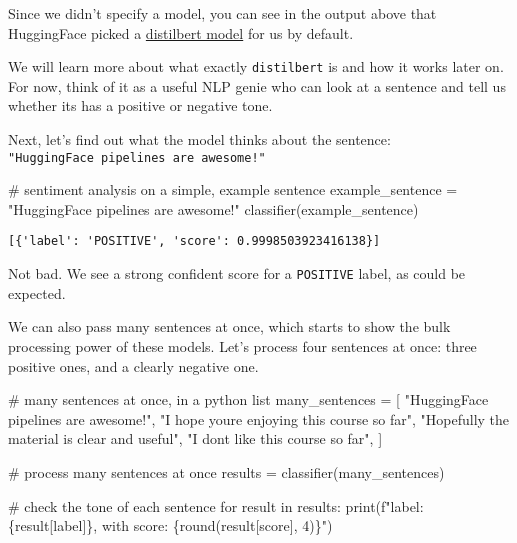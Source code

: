 \documentclass[
  letterpaper,
  DIV=11,
  numbers=noendperiod]{scrartcl}
\newenvironment{Shaded}{\begin{snugshade}}{\end{snugshade}}
\newcommand{\BuiltInTok}[1]{\textcolor[rgb]{0.00,0.23,0.31}{#1}}
\newcommand{\CommentTok}[1]{\textcolor[rgb]{0.37,0.37,0.37}{#1}}
\newcommand{\ControlFlowTok}[1]{\textcolor[rgb]{0.00,0.23,0.31}{#1}}
\newcommand{\DecValTok}[1]{\textcolor[rgb]{0.68,0.00,0.00}{#1}}
\newcommand{\KeywordTok}[1]{\textcolor[rgb]{0.00,0.23,0.31}{#1}}
\newcommand{\NormalTok}[1]{\textcolor[rgb]{0.00,0.23,0.31}{#1}}
\newcommand{\OperatorTok}[1]{\textcolor[rgb]{0.37,0.37,0.37}{#1}}
\newcommand{\SpecialCharTok}[1]{\textcolor[rgb]{0.37,0.37,0.37}{#1}}
\newcommand{\SpecialStringTok}[1]{\textcolor[rgb]{0.13,0.47,0.30}{#1}}
\newcommand{\StringTok}[1]{\textcolor[rgb]{0.13,0.47,0.30}{#1}}
\begin{document}
Since we didn't specify a model, you can see in the output above that
HuggingFace picked a
\href{distilbert-base-uncased-finetuned-sst-2-english}{distilbert model}
for us by default.

We will learn more about what exactly \texttt{distilbert} is and how it
works later on. For now, think of it as a useful NLP genie who can look
at a sentence and tell us whether its has a positive or negative tone.

Next, let's find out what the model thinks about the sentence:
\texttt{"HuggingFace\ pipelines\ are\ awesome!"}

\begin{Shaded}
\begin{Highlighting}[]
\CommentTok{\# sentiment analysis on a simple, example sentence}
\NormalTok{example\_sentence }\OperatorTok{=} \StringTok{"HuggingFace pipelines are awesome!"}
\NormalTok{classifier(example\_sentence)}
\end{Highlighting}
\end{Shaded}

\begin{verbatim}
[{'label': 'POSITIVE', 'score': 0.9998503923416138}]
\end{verbatim}

Not bad. We see a strong confident score for a \texttt{POSITIVE} label,
as could be expected.

We can also pass many sentences at once, which starts to show the bulk
processing power of these models. Let's process four sentences at once:
three positive ones, and a clearly negative one.

\begin{Shaded}
\begin{Highlighting}[]
\CommentTok{\# many sentences at once, in a python list}
\NormalTok{many\_sentences }\OperatorTok{=}\NormalTok{ [}
    \StringTok{"HuggingFace pipelines are awesome!"}\NormalTok{,}
    \StringTok{"I hope you\textquotesingle{}re enjoying this course so far"}\NormalTok{,}
    \StringTok{"Hopefully the material is clear and useful"}\NormalTok{,}
    \StringTok{"I don\textquotesingle{}t like this course so far"}\NormalTok{,}
\NormalTok{]}

\CommentTok{\# process many sentences at once}
\NormalTok{results }\OperatorTok{=}\NormalTok{ classifier(many\_sentences)}

\CommentTok{\# check the tone of each sentence}
\ControlFlowTok{for}\NormalTok{ result }\KeywordTok{in}\NormalTok{ results:}
    \BuiltInTok{print}\NormalTok{(}\SpecialStringTok{f"label: }\SpecialCharTok{\{}\NormalTok{result[}\StringTok{\textquotesingle{}label\textquotesingle{}}\NormalTok{]}\SpecialCharTok{\}}\SpecialStringTok{, with score: }\SpecialCharTok{\{}\BuiltInTok{round}\NormalTok{(result[}\StringTok{\textquotesingle{}score\textquotesingle{}}\NormalTok{], }\DecValTok{4}\NormalTok{)}\SpecialCharTok{\}}\SpecialStringTok{"}\NormalTok{)}
\end{Highlighting}
\end{Shaded}
\end{document}

